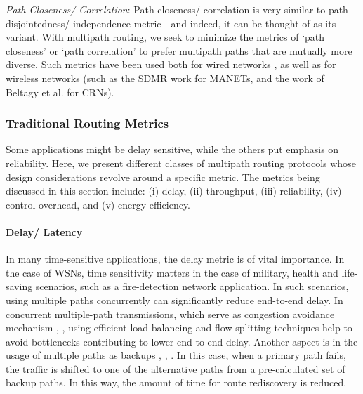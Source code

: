 \documentclass[10pt]{IEEEtran}
\begin{document}
\vspace{2mm}
\textit{Path Closeness/ Correlation}: Path closeness/ correlation is very similar to path disjointedness/ independence metric---and indeed, it can be thought of as its variant. With multipath routing, we seek to minimize the metrics of `path closeness' or `path correlation' to prefer multipath paths that are mutually more diverse. Such metrics have been used both for wired networks \cite{ma2004new}, \cite{liao2011introducing} as well as for wireless networks (such as the SDMR \cite{galvez2008spatially} work for MANETs, and the work of Beltagy et al. for CRNs). 

\vspace{2mm}
\subsubsection{Traditional Routing Metrics}

Some applications might be delay sensitive, while the others put emphasis on reliability. Here, we present different classes of multipath routing protocols whose design considerations revolve around a specific metric. The metrics being discussed in this section include: (i) delay, (ii) throughput, (iii) reliability, (iv) control overhead, and (v) energy efficiency. 

\vspace{2mm}
\paragraph{Delay/ Latency}
\label{subsec:delay}

In many time-sensitive applications, the delay metric is of vital importance. In the case of WSNs, time sensitivity matters in the case of military, health and life-saving scenarios, such as a fire-detection network application. In such scenarios, using multiple paths concurrently can significantly reduce end-to-end delay. In concurrent multiple-path transmissions, which serve as congestion avoidance mechanism \cite{villamizar1999ospf}, \cite{villamizar1999mpls}, using efficient load balancing and flow-splitting techniques help to avoid bottlenecks contributing to lower end-to-end delay. Another aspect is in the usage of multiple paths as backups \cite{li2004demand}, \cite{sambasivam2004dynamically}, \cite{marina2001demand}. In this case, when a primary path fails, the traffic is shifted to one of the alternative paths from a pre-calculated set of backup paths. In this way, the amount of time for route rediscovery is reduced.
\end{document}
